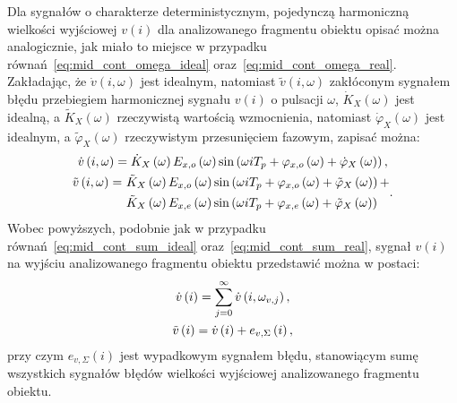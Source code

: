 Dla sygnałów o charakterze deterministycznym, pojedynczą harmoniczną wielkości wyjściowej $v(i)$ dla analizowanego fragmentu obiektu opisać można analogicznie, jak miało to miejsce w przypadku równań~\eqref{eq:mid_cont_omega_ideal} oraz~\eqref{eq:mid_cont_omega_real}. Zakładając, że $\dot{v}(i,\omega)$ jest idealnym, natomiast $\tilde{v}(i,\omega)$ zakłóconym sygnałem błędu przebiegiem harmonicznej sygnału $v(i)$ o pulsacji $\omega$, $\dot{K}_{X}(\omega)$ jest idealną, a $\tilde{K}_{X}(\omega)$ rzeczywistą wartością wzmocnienia, natomiast $\dot{\varphi}_{X}(\omega)$ jest idealnym, a $\tilde{\varphi}_{X}(\omega)$ rzeczywistym przesunięciem fazowym, zapisać można:
\begin{gather}
\dot{v} \left(i,\omega\right) = \dot{K}_{X} \left(\omega\right) E_{x,o} \left(\omega\right) \sin \left( \omega iT_{p} + \varphi_{x,o} \left(\omega\right) + \dot{\varphi}_{X} \left(\omega\right) \right) \label{eq:mid_disc_omega_ideal}, \\
\begin{split}
\tilde{v} \left(i,\omega\right) =~
& \tilde{K}_{X} \left(\omega\right) E_{x,o} \left(\omega\right) \sin \left( \omega iT_{p} + \varphi_{x,o} \left(\omega\right) + \tilde{\varphi}_{X} \left(\omega\right) \right) + \\
& \tilde{K}_{X} \left(\omega\right) E_{x,e} \left(\omega\right) \sin \left( \omega iT_{p} + \varphi_{x,e} \left(\omega\right) + \tilde{\varphi}_{X} \left(\omega\right) \right)
\end{split}
\label{eq:mid_disc_omega_real}.
\end{gather}
Wobec powyższych, podobnie jak w przypadku równań~\eqref{eq:mid_cont_sum_ideal} oraz~\eqref{eq:mid_cont_sum_real}, sygnał $v(i)$ na wyjściu analizowanego fragmentu obiektu przedstawić można w postaci:
\begin{gather}
\dot{v} \left(i\right) = \sum _{j = 0} ^{\infty} \dot{v} \left( i, \omega_{v,j} \right) \label{eq:mid_disc_sum_ideal}, \\
\tilde{v} \left(i\right) = \dot{v} \left(i\right) + e_{v,\Sigma} \left(i\right) \label{eq:mid_disc_sum_real},
\end{gather}
przy czym $e_{v,\Sigma}(i)$ jest wypadkowym sygnałem błędu, stanowiącym sumę wszystkich sygnałów błędów wielkości wyjściowej analizowanego fragmentu obiektu.

